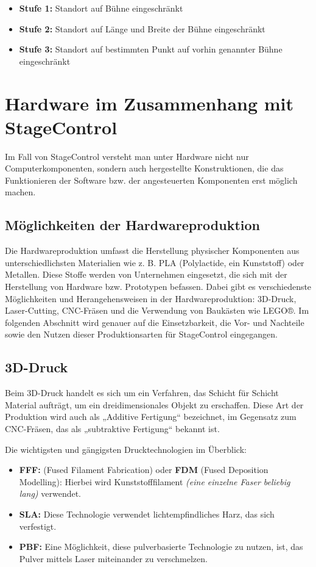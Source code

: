 \begin{itemize}
	\item \textbf{Stufe 1: }Standort auf Bühne eingeschränkt
	\item \textbf{Stufe 2: }Standort auf Länge und Breite der Bühne eingeschränkt
	\item \textbf{Stufe 3: }Standort auf bestimmten Punkt auf vorhin genannter Bühne eingeschränkt
\end{itemize}

\section{Hardware im Zusammenhang mit StageControl}
Im Fall von StageControl versteht man unter Hardware nicht nur Computerkomponenten, sondern auch hergestellte Konstruktionen, die das Funktionieren der Software bzw. der angesteuerten Komponenten erst möglich machen.

\subsection{Möglichkeiten der Hardwareproduktion}
Die Hardwareproduktion umfasst die Herstellung physischer Komponenten aus unterschiedlichsten Materialien wie z. B. PLA (Polylactide, ein Kunststoff) oder Metallen. Diese Stoffe werden von Unternehmen eingesetzt, die sich mit der Herstellung von Hardware bzw. Prototypen befassen. Dabei gibt es verschiedenste Möglichkeiten und Herangehensweisen in der Hardwareproduktion: 3D-Druck, Laser-Cutting, CNC-Fräsen und die Verwendung von Baukästen wie LEGO®. Im folgenden Abschnitt wird genauer auf die Einsetzbarkeit, die Vor- und Nachteile sowie den Nutzen dieser Produktionsarten für StageControl eingegangen.

\subsection{3D-Druck}
Beim 3D-Druck handelt es sich um ein Verfahren, das Schicht für Schicht Material aufträgt, um ein dreidimensionales Objekt zu erschaffen. Diese Art der Produktion wird auch als „Additive Fertigung“ bezeichnet, im Gegensatz zum CNC-Fräsen, das als „subtraktive Fertigung“ bekannt ist.

Die wichtigsten und gängigsten Drucktechnologien im Überblick:

\begin{itemize}
	\item \textbf{FFF:} (Fused Filament Fabrication) oder \textbf{FDM} (Fused Deposition Modelling): Hierbei wird Kunststofffilament \emph{(eine einzelne Faser beliebig lang)} verwendet.
	\item \textbf{SLA:} Diese Technologie verwendet lichtempfindliches Harz, das sich verfestigt.
	\item \textbf{PBF:} Eine Möglichkeit, diese pulverbasierte Technologie zu nutzen, ist, das Pulver mittels Laser miteinander zu verschmelzen. 
\end{itemize}

